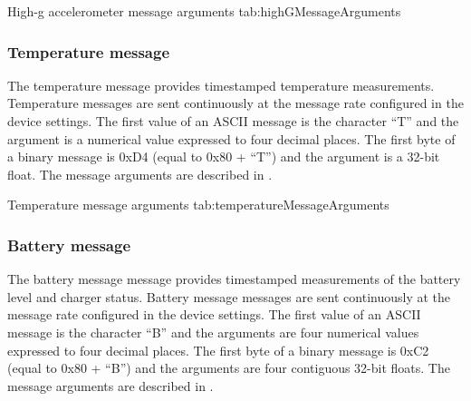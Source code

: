 \begingroup
    \def\tempArgumentA{High-g accelerometer X axis in g}
    \def\tempArgumentB{High-g accelerometer Y axis in g}
    \def\tempArgumentC{High-g accelerometer Z axis in g}
    \dataMessageTable
    {High-g accelerometer message arguments}
    {tab:highGMessageArguments}
\endgroup

\begingroup
    \def\tempNameA{High-g accelerometer X axis}
    \def\tempNameB{High-g accelerometer Y axis}
    \def\tempNameC{High-g accelerometer Z axis}
    \def\tempValueA{0}
    \def\tempValueB{0}
    \def\tempValueC{1}
    \def\tempAsciiFirst{H}
    \def\tempAsciiA{0.0000}
    \def\tempAsciiB{0.0000}
    \def\tempAsciiC{1.0000}
    \def\tempBinaryFirst{C8}
    \def\tempBinaryA{00 00 00 00}
    \def\tempBinaryB{00 00 00 00}
    \def\tempBinaryC{00 00 80 3F}
    \dataMessageExample
\endgroup

\subsubsection{Temperature message}

The temperature message provides timestamped temperature measurements.  Temperature messages are sent continuously at the message rate configured in the device settings.  The first value of an \ac{ASCII} message is the character \enquote{T} and the argument is a numerical value expressed to four decimal places.  The first byte of a binary message is 0xD4 (equal to 0x80 + \enquote{T}) and the argument is a 32-bit float.  The message arguments are described in .

\begingroup
    \def\tempArgumentA{Temperature in degrees Celsius}
    \dataMessageTable
    {Temperature message arguments}
    {tab:temperatureMessageArguments}
\endgroup

\begingroup
    \def\tempNameA{Temperature}
    \def\tempValueA{25}
    \def\tempAsciiFirst{T}
    \def\tempAsciiA{25.0000}
    \def\tempBinaryFirst{D4}
    \def\tempBinaryA{00 00 41 C8}
    \dataMessageExample
\endgroup

\subsubsection{Battery message}

The battery message message provides timestamped measurements of the battery level and charger status.  Battery message messages are sent continuously at the message rate configured in the device settings.  The first value of an \ac{ASCII} message is the character \enquote{B} and the arguments are four numerical values expressed to four decimal places.  The first byte of a binary message is 0xC2 (equal to 0x80 + \enquote{B}) and the arguments are four contiguous 32-bit floats.  The message arguments are described in .


